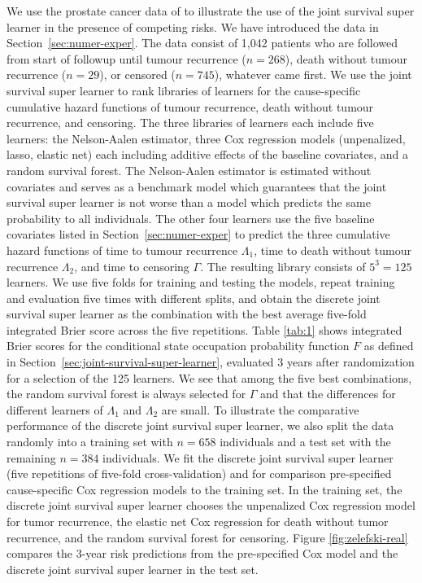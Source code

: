 \documentclass[alpha-refs]{wiley-article}
\newcommand{\1}{\mathds{1}}
\begin{document}
We use the prostate cancer data of \cite{kattan2000pretreatment} to
illustrate the use of the joint survival super learner in the presence
of competing risks. We have introduced the data in
Section~\ref{sec:numer-exper}. The data consist of 1,042 patients who
are followed from start of followup until tumour recurrence ($n=268$),
death without tumour recurrence ($n=29$), or censored ($n=745$),
whatever came first. We use the joint survival super learner to rank
libraries of learners for the cause-specific cumulative hazard
functions of tumour recurrence, death without tumour recurrence, and
censoring. The three libraries of learners each include five learners:
the Nelson-Aalen estimator, three Cox regression models (unpenalized,
lasso, elastic net) each including additive effects of the baseline
covariates, and a random survival forest. The Nelson-Aalen estimator
is estimated without covariates and serves as a benchmark model which
guarantees that the joint survival super learner is not worse than a
model which predicts the same probability to all individuals. The
other four learners use the five baseline covariates listed in
Section~\ref{sec:numer-exper} to predict the three cumulative hazard
functions of time to tumour recurrence \( \Lambda_1 \), time to death
without tumour recurrence \( \Lambda_2 \), and time to censoring
$\Gamma$. The resulting library consists of \( 5^3 = 125 \)
learners. We use five folds for training and testing the models,
repeat training and evaluation five times with different splits, and
obtain the discrete joint survival super learner as the combination
with the best average five-fold integrated Brier score across the five
repetitions. Table \ref{tab:1} shows integrated Brier scores for the
conditional state occupation probability function \( F \) as defined
in Section~\ref{sec:joint-survival-super-learner}, evaluated 3 years
after randomization for a selection of the 125 learners. We see that
among the five best combinations, the random survival forest is always
selected for \(\Gamma\) and that the differences for different
learners of \(\Lambda_1\) and \(\Lambda_2\) are small. To illustrate
the comparative performance of the discrete joint survival super
learner, we also split the data randomly into a training set with
\(n=658\) individuals and a test set with the remaining \(n=384\)
individuals.  We fit the discrete joint survival super learner (five
repetitions of five-fold cross-validation) and for comparison
pre-specified cause-specific Cox regression models to the training
set. In the training set, the discrete joint survival super learner
chooses the unpenalized Cox regression model for tumor recurrence, the
elastic net Cox regression for death without tumor recurrence, and the
random survival forest for censoring. Figure \ref{fig:zelefski-real}
compares the 3-year risk predictions from the pre-specified Cox model
and the discrete joint survival super learner in the test set.
\end{document}
